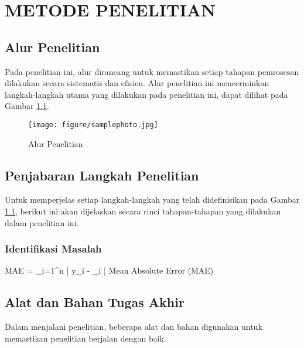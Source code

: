 \newpage
\chapter{METODE PENELITIAN} \label{Bab III}

\section{Alur Penelitian} \label{III.Alur}
Pada penelitian ini, alur dirancang untuk memastikan setiap tahapan pemrosesan dilakukan secara sistematis dan efisien. Alur penelitian ini mencerminkan langkah-langkah utama yang dilakukan pada penelitian ini, dapat dilihat pada Gambar \ref{fig:3.alur}. \par

\begin{figure}[H] %
    \centering
    \texttt{[image: figure/samplephoto.jpg]}
    \caption{Alur Penelitian}
    \label{fig:3.alur}
\end{figure}

\section{Penjabaran Langkah Penelitian} \label{III.Jabar Alur}
Untuk memperjelas setiap langkah-langkah yang telah didefinisikan pada Gambar \ref{fig:3.alur}, berikut ini akan dijelaskan secara rinci tahapan-tahapan yang dilakukan dalam penelitian ini.

\subsection{Identifikasi Masalah} \label{III.Identifikasi_masalah}
\lipsum[1] \par%

\begin{equationcaptioned}[eq:3.mae]{
		MAE =  \sum_{i=1}^{n} \left| y_i - _i \right|
	}{
		Mean Absolute Error (MAE)
	}
\end{equationcaptioned}

\section{Alat dan Bahan Tugas Akhir} \label{III.Alat dan Bahan}
Dalam menjalani penelitian, beberapa alat dan bahan digunakan untuk memastikan penelitian berjalan dengan baik.\par

